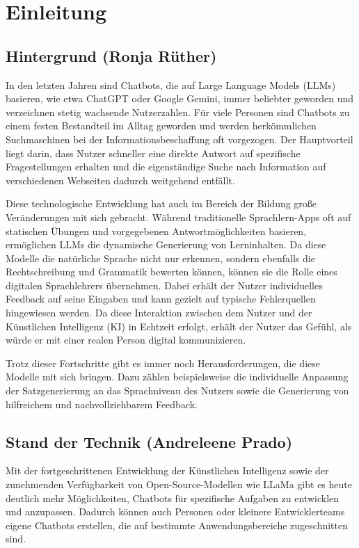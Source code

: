 \newpage
\section{Einleitung}
\subsection{Hintergrund (Ronja Rüther)}
In den letzten Jahren sind Chatbots, die auf Large Language Models (LLMs) basieren, wie etwa ChatGPT oder Google Gemini, 
immer beliebter geworden und verzeichnen stetig wachsende Nutzerzahlen. Für viele Personen sind Chatbots zu einem festen 
Bestandteil im Alltag geworden und werden herkömmlichen Suchmaschinen bei der Informationsbeschaffung oft vorgezogen. 
Der Hauptvorteil liegt darin, dass Nutzer schneller eine direkte Antwort auf spezifische Fragestellungen erhalten und 
die eigenständige Suche nach Information auf verschiedenen Webseiten dadurch weitgehend entfällt. \parencite{AIPunk2025}

Diese technologische Entwicklung hat auch im Bereich der Bildung große Veränderungen mit sich gebracht.
Während traditionelle Sprachlern-Apps oft auf statischen Übungen und vorgegebenen Antwortmöglichkeiten basieren,
ermöglichen LLMs die dynamische Generierung von Lerninhalten. Da diese Modelle die natürliche Sprache nicht nur erkennen, 
sondern ebenfalls die Rechtschreibung und Grammatik bewerten können, können sie die Rolle eines digitalen Sprachlehrers 
übernehmen. \parencite{Vorteile_KI_Bildung} 
Dabei erhält der Nutzer individuelles Feedback auf seine Eingaben und kann gezielt auf typische Fehlerquellen
hingewiesen werden. Da diese Interaktion zwischen dem Nutzer und der Künstlichen Intelligenz (KI) in Echtzeit erfolgt, erhält der Nutzer das Gefühl, 
als würde er mit einer realen Person digital kommunizieren. \parencite{Vorteile_KI_Bildung}

Trotz dieser Fortschritte gibt es immer noch Herausforderungen, die diese Modelle mit sich bringen. \parencite{Vorteile_KI_Bildung}
Dazu zählen beispielsweise die individuelle Anpassung der Satzgenerierung an das Sprachniveau des Nutzers sowie die Generierung von 
hilfreichem und nachvollziehbarem Feedback.

\subsection{Stand der Technik (Andreleene Prado)}
Mit der fortgeschrittenen Entwicklung der Künstlichen Intelligenz sowie der zunehmenden Verfügbarkeit von Open-Source-Modellen wie LLaMa gibt es heute deutlich mehr Möglichkeiten,
Chatbots für spezifische Aufgaben zu entwicklen und anzupassen. Dadurch können auch Personen oder kleinere Entwicklerteams eigene Chatbots erstellen, die auf bestimmte
Anwendungsbereiche zugeschnitten sind.

